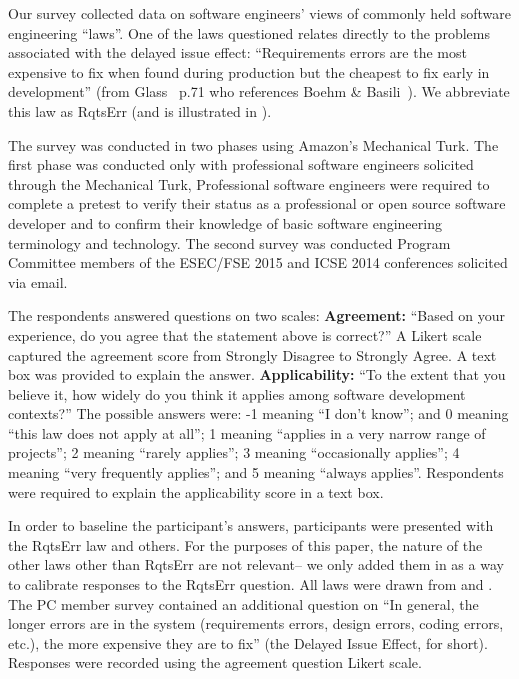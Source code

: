 




Our survey collected data on software engineers' views of commonly held software engineering ``laws''.
One of the laws questioned relates directly to the problems associated with
the delayed issue effect: ``Requirements errors are the most expensive to fix when found during production but the cheapest to fix early in development'' (from Glass~\cite{glass02} p.71 who references Boehm \& Basili~\cite{boehm01}). We abbreviate this law as RqtsErr
(and is
illustrated in ).

The survey was conducted in two phases using Amazon's Mechanical Turk. The first phase was conducted only with professional software engineers solicited through the Mechanical Turk,
Professional software engineers were required to complete a pretest to verify their status as a professional or open source software developer and to confirm their knowledge of basic software engineering terminology and technology. The  second survey was conducted Program Committee members of the ESEC/FSE 2015 and ICSE 2014  conferences solicited via email.

The respondents answered questions on two scales: \newline
\textbf{Agreement:} ``Based on your experience, do you agree that the statement above is correct?'' A Likert scale captured the agreement score from Strongly Disagree to Strongly Agree. A text box was provided to explain the answer. \newline
\textbf{Applicability:} ``To the extent that you believe it, how widely do you think it applies among software development contexts?'' The possible answers were: 
-1 meaning ``I don't know''; and 0 meaning ``this law does not apply at all'';
 1 meaning ``applies in a very narrow range of projects'';  2 meaning
``rarely applies'';   3 meaning
``occasionally applies'';  
4 meaning ``very frequently applies''; and
 5 meaning ``always applies''.
Respondents were required to explain the applicability score in a text box.

In order to baseline the participant's answers, participants were presented with the RqtsErr law and others. For the purposes
of this paper, the nature of the other laws other than RqtsErr are not relevant-- we
only added them in as a way to calibrate responses to the RqtsErr question. All laws were drawn from \cite{glass02} and \cite{endres03}. 
The PC member survey contained an additional question on ``In general, the longer errors are in the system (requirements errors, design errors, coding errors, etc.), the more expensive they are to fix'' (the Delayed Issue Effect, for short). Responses were recorded using the agreement question Likert scale. 


